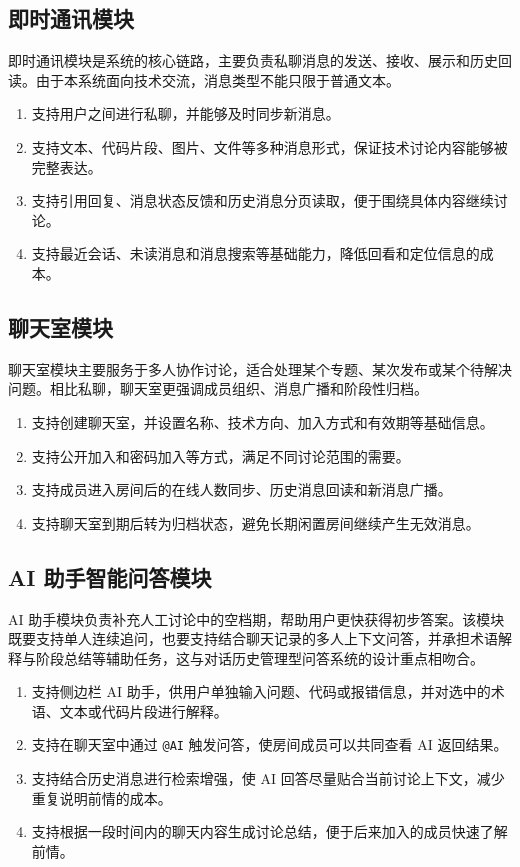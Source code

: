 \subsection{即时通讯模块}

即时通讯模块是系统的核心链路，主要负责私聊消息的发送、接收、展示和历史回读。由于本系统面向技术交流，消息类型不能只限于普通文本。

\begin{enumerate}[label={(\arabic*)}, leftmargin=2.4em]
\item 支持用户之间进行私聊，并能够及时同步新消息。
\item 支持文本、代码片段、图片、文件等多种消息形式，保证技术讨论内容能够被完整表达。
\item 支持引用回复、消息状态反馈和历史消息分页读取，便于围绕具体内容继续讨论。
\item 支持最近会话、未读消息和消息搜索等基础能力，降低回看和定位信息的成本。
\end{enumerate}

\subsection{聊天室模块}

聊天室模块主要服务于多人协作讨论，适合处理某个专题、某次发布或某个待解决问题。相比私聊，聊天室更强调成员组织、消息广播和阶段性归档。

\begin{enumerate}[label={(\arabic*)}, leftmargin=2.4em]
\item 支持创建聊天室，并设置名称、技术方向、加入方式和有效期等基础信息。
\item 支持公开加入和密码加入等方式，满足不同讨论范围的需要。
\item 支持成员进入房间后的在线人数同步、历史消息回读和新消息广播。
\item 支持聊天室到期后转为归档状态，避免长期闲置房间继续产生无效消息。
\end{enumerate}

\subsection{AI 助手智能问答模块}

AI 助手模块负责补充人工讨论中的空档期，帮助用户更快获得初步答案。该模块既要支持单人连续追问，也要支持结合聊天记录的多人上下文问答，并承担术语解释与阶段总结等辅助任务，这与对话历史管理型问答系统的设计重点相吻合\cite{historyragqa2026}。

\begin{enumerate}[label={(\arabic*)}, leftmargin=2.4em]
\item 支持侧边栏 AI 助手，供用户单独输入问题、代码或报错信息，并对选中的术语、文本或代码片段进行解释。
\item 支持在聊天室中通过 \texttt{@AI} 触发问答，使房间成员可以共同查看 AI 返回结果。
\item 支持结合历史消息进行检索增强，使 AI 回答尽量贴合当前讨论上下文，减少重复说明前情的成本。
\item 支持根据一段时间内的聊天内容生成讨论总结，便于后来加入的成员快速了解前情。
\end{enumerate}

